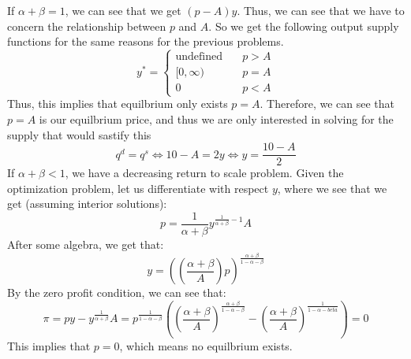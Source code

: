 \documentclass[11pt]{article}
\begin{document}
If $\alpha + \beta = 1$, we can see that we get $(p - A)y$. Thus, we can see that we have to concern the relationship between $p$ and $A$. So we get the following output supply functions for the same reasons for the previous problems. 
\[
y^* = \begin{cases}
    \text{undefined} & \quad p > A\\
    [0, \infty) & \quad p = A\\
    0 & \quad p < A
\end{cases}
\]
Thus, this implies that equilbrium only exists $p=A$. Therefore, we can see that $p =  A$ is our equilbrium price, and thus we are only interested in solving for the supply that would sastify this
\[
q^d = q^s  \iff 10 - A = 2y \iff y = \frac{10 - A}{2}
\]
If $\alpha + \beta < 1$, we have a decreasing return to scale problem. Given the optimization problem, let us differentiate with respect $y$, where we see that we get (assuming interior solutions):
\[
p = \frac{1}{\alpha + \beta} y^{\frac{1}{\alpha + \beta} - 1} A
\]
After some algebra, we get that:
\[
y = \left(\left( \frac{\alpha + \beta}{A} \right) p\right)^\frac{\alpha + \beta}{1-\alpha-\beta}
\]
By the zero profit condition, we can see that:
\[
\pi = py -y^\frac{1}{\alpha + \beta} A = p^\frac{1}{1-\alpha - \beta} \left( \left( \frac{\alpha + \beta}{A} \right)^\frac{\alpha + \beta}{1-\alpha - \beta} - \left( \frac{\alpha + \beta}{A} \right)^\frac{1}{1-\alpha-beta}\right) = 0
\]
This implies that $p =0$, which means no equilbrium exists. 
\section{}
\end{document}
